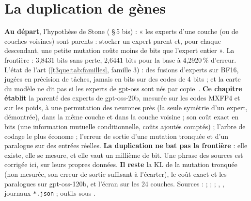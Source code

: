 \chapter{La duplication de gènes}\label{t3dup:ch}

\begin{origine}
\textbf{Au départ}, l'hypothèse de Stone ( §\,5 bis) : « les experts d'une couche (ou de couches voisines) sont parents : stocker un expert parent et, pour chaque descendant, une petite mutation coûte moins de bits que l'expert entier ». La frontière : 3,8431 bits sans perte, 2,6441 bits pour la base à 4,2920\,\% d'erreur. L'état de l'art (\cref{t3que:tab:familles}, famille 3) : des fusions d'experts sur BF16, jugées en précision de tâches, jamais en bits sur des codes de 4 bits ; et la carte du modèle ne dit pas si les experts de gpt-oss sont nés par copie~\cite{openai2025gptoss}.
\textbf{Ce chapitre établit} la parenté des experts de gpt-oss-20b, mesurée sur les codes MXFP4 et sur les poids, à une permutation des neurones près (la seule symétrie d'un expert, démontrée), dans la même couche et dans la couche voisine ; son coût exact en bits (une information mutuelle conditionnelle, coûts ajoutés comptés) ; l'arbre de codage le plus économe ; l'erreur de sortie d'une mutation tronquée et d'un paralogue sur des entrées réelles. \textbf{La duplication ne bat pas la frontière} : elle existe, elle se mesure, et elle vaut un millième de bit. Une phrase des sources est corrigée ici, sur leurs propres données.
\textbf{Il reste} la KL de la mutation tronquée (non mesurée, son erreur de sortie suffisant à l'écarter), le coût exact et les paralogues sur gpt-oss-120b, et l'écran sur les 24 couches.
Sources :  ;  ;  ; , , journaux \texttt{*.json} ; outils sous .
\end{origine}

